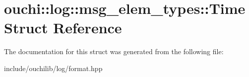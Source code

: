 \hypertarget{structouchi_1_1log_1_1msg__elem__types_1_1_time}{}\section{ouchi\+::log\+::msg\+\_\+elem\+\_\+types\+::Time Struct Reference}
\label{structouchi_1_1log_1_1msg__elem__types_1_1_time}


The documentation for this struct was generated from the following file\+:\begin{DoxyCompactItemize}
\item 
include/ouchilib/log/format.\+hpp\end{DoxyCompactItemize}

